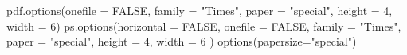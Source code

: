\begin{Schunk}
\begin{Sinput}
 pdf.options(onefile = FALSE, family = "Times", paper = "special", height = 4, width = 6)
 ps.options(horizontal = FALSE, onefile = FALSE, family = "Times", paper = "special", height = 4, width = 6 )
 options(papersize="special")
\end{Sinput}
\end{Schunk}
